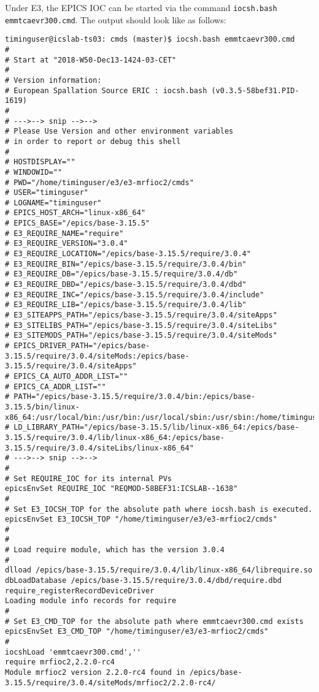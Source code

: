 \documentclass[11pt
  , a4paper
  , article
  , oneside
  , showtrims
]{memoir}
\begin{document}
{Under E3, the EPICS IOC can be started via the command \texttt{iocsh.bash emmtcaevr300.cmd}. The output should look like as follows:
\begin{lstlisting}[style=termstyle]
timinguser@icslab-ts03: cmds (master)$ iocsh.bash emmtcaevr300.cmd
#
# Start at "2018-W50-Dec13-1424-03-CET"
#
# Version information:
# European Spallation Source ERIC : iocsh.bash (v0.3.5-58bef31.PID-1619)
#
# --->--> snip -->-->
# Please Use Version and other environment variables
# in order to report or debug this shell
#
# HOSTDISPLAY=""
# WINDOWID=""
# PWD="/home/timinguser/e3/e3-mrfioc2/cmds"
# USER="timinguser"
# LOGNAME="timinguser"
# EPICS_HOST_ARCH="linux-x86_64"
# EPICS_BASE="/epics/base-3.15.5"
# E3_REQUIRE_NAME="require"
# E3_REQUIRE_VERSION="3.0.4"
# E3_REQUIRE_LOCATION="/epics/base-3.15.5/require/3.0.4"
# E3_REQUIRE_BIN="/epics/base-3.15.5/require/3.0.4/bin"
# E3_REQUIRE_DB="/epics/base-3.15.5/require/3.0.4/db"
# E3_REQUIRE_DBD="/epics/base-3.15.5/require/3.0.4/dbd"
# E3_REQUIRE_INC="/epics/base-3.15.5/require/3.0.4/include"
# E3_REQUIRE_LIB="/epics/base-3.15.5/require/3.0.4/lib"
# E3_SITEAPPS_PATH="/epics/base-3.15.5/require/3.0.4/siteApps"
# E3_SITELIBS_PATH="/epics/base-3.15.5/require/3.0.4/siteLibs"
# E3_SITEMODS_PATH="/epics/base-3.15.5/require/3.0.4/siteMods"
# EPICS_DRIVER_PATH="/epics/base-3.15.5/require/3.0.4/siteMods:/epics/base-3.15.5/require/3.0.4/siteApps"
# EPICS_CA_AUTO_ADDR_LIST=""
# EPICS_CA_ADDR_LIST=""
# PATH="/epics/base-3.15.5/require/3.0.4/bin:/epics/base-3.15.5/bin/linux-x86_64:/usr/local/bin:/usr/bin:/usr/local/sbin:/usr/sbin:/home/timinguser/.local/bin:/home/timinguser/bin"
# LD_LIBRARY_PATH="/epics/base-3.15.5/lib/linux-x86_64:/epics/base-3.15.5/require/3.0.4/lib/linux-x86_64:/epics/base-3.15.5/require/3.0.4/siteLibs/linux-x86_64"
# --->--> snip -->-->
#
# Set REQUIRE_IOC for its internal PVs
epicsEnvSet REQUIRE_IOC "REQMOD-58BEF31:ICSLAB--1638"
#
# Set E3_IOCSH_TOP for the absolute path where iocsh.bash is executed.
epicsEnvSet E3_IOCSH_TOP "/home/timinguser/e3/e3-mrfioc2/cmds"
#
#
# Load require module, which has the version 3.0.4
#
dlload /epics/base-3.15.5/require/3.0.4/lib/linux-x86_64/librequire.so
dbLoadDatabase /epics/base-3.15.5/require/3.0.4/dbd/require.dbd
require_registerRecordDeviceDriver
Loading module info records for require
#
# Set E3_CMD_TOP for the absolute path where emmtcaevr300.cmd exists
epicsEnvSet E3_CMD_TOP "/home/timinguser/e3/e3-mrfioc2/cmds"
#
iocshLoad 'emmtcaevr300.cmd',''
require mrfioc2,2.2.0-rc4
Module mrfioc2 version 2.2.0-rc4 found in /epics/base-3.15.5/require/3.0.4/siteMods/mrfioc2/2.2.0-rc4/

\end{lstlisting}}
\end{document}
